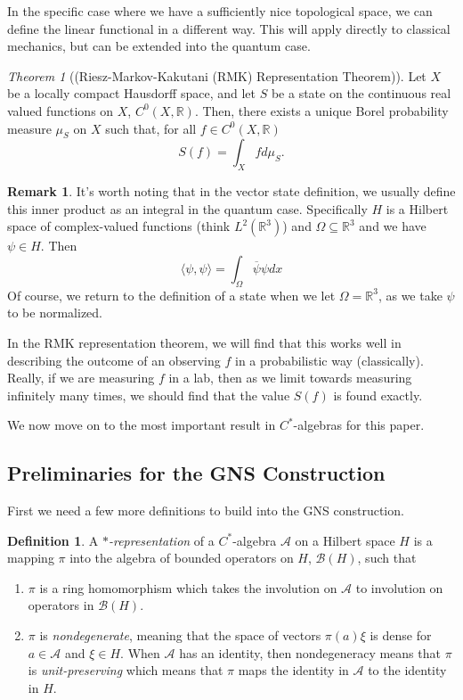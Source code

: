 \documentclass[leqno]{article}
\theoremstyle{definition}
\newtheorem{definition}{Definition}[section]
\newtheorem*{remark}{Remark}
\theoremstyle{remark}
\theoremstyle{theorem}
\newtheorem{theorem}{Theorem}[section]
\newcommand{\R}{\mathbb{R}}
\newcommand{\A}{\mathcal{A}}
\begin{document}
In the specific case where we have a sufficiently nice topological space, we can define the linear functional in a different way. This will apply directly to classical mechanics, but can be extended into the quantum case.

\begin{theorem}[(Riesz-Markov-Kakutani (RMK) Representation Theorem)]
Let $X$ be a locally compact Hausdorff space, and let $S$ be a state on the continuous real valued functions on $X$, $C^0(X,\R)$. Then, there exists a unique Borel probability measure $\mu_S$ on $X$ such that, for all $f\in C^0(X,\R)$
\[
S(f)=\int_X f d\mu_S.
\]
\end{theorem}

\begin{remark}
It's worth noting that in the vector state definition, we usually define this inner product as an integral in the quantum case. Specifically $H$ is a Hilbert space of complex-valued functions (think $L^2(\R^3)$) and $\Omega \subseteq \R^3$ and we have $\psi \in H$. Then 
\[
\langle \psi, \psi \rangle = \int_\Omega \overline{\psi}\psi  dx
\]
Of course, we return to the definition of a state when we let $\Omega=\R^3$, as we take $\psi$ to be normalized.

In the RMK representation theorem, we will find that this works well in describing the outcome of an observing $f$ in a probabilistic way (classically). Really, if we are measuring $f$ in a lab, then as we limit towards measuring infinitely many times, we should find that the value $S(f)$ is found exactly.
\end{remark}

\noindent We now move on to the most important result in $C^*$-algebras for this paper. 

\subsection{Preliminaries for the GNS Construction}

First we need a few more definitions to build into the GNS construction.

\begin{definition}
A \emph{$*$-representation} of a $C^*$-algebra $\A$ on a Hilbert space $H$ is a mapping $\pi$ into the algebra of bounded operators on $H$, $\mathscr{B}(H)$, such that
\begin{enumerate}[1.]
\item $\pi$ is a ring homomorphism which takes the involution on $\A$ to involution on operators in $\mathscr{B}(H)$.
\item $\pi$ is \emph{nondegenerate}, meaning that the space of vectors $\pi(a)\xi$ is dense for $a\in \A$ and $\xi\in H$. When $\A$ has an identity, then nondegeneracy means that $\pi$ is \emph{unit-preserving} which means that $\pi$ maps the identity in $\A$ to the identity in $H$.  
\end{enumerate}
\end{definition}
\end{document}

